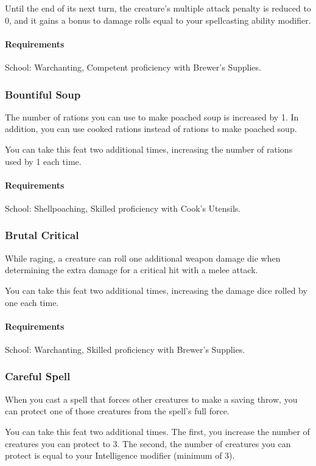     Until the end of its next turn, the creature's multiple attack penalty is reduced to 0, and it gains a bonus to damage rolls equal to your spellcasting ability modifier.
    \paragraph{Requirements} School: Warchanting, Competent proficiency with Brewer's Supplies.
\subsubsection{Bountiful Soup} \label{feat::bountifulsoup}
    The number of rations you can use to make poached soup is increased by 1.
    In addition, you can use cooked rations instead of rations to make poached soup.

    You can take this feat two additional times, increasing the number of rations used by 1 each time.
    \paragraph{Requirements} School: Shellpoaching, Skilled proficiency with Cook's Utensils.
\subsubsection{Brutal Critical} \label{feat::brutalcritical}
    While raging, a creature can roll one additional weapon damage die when determining the extra damage for a critical hit with a melee attack.

    You can take this feat two additional times, increasing the damage dice rolled by one each time.
    \paragraph{Requirements} School: Warchanting, Skilled proficiency with Brewer's Supplies.
\subsubsection{Careful Spell} \label{feat::carefulspell}
    When you cast a spell that forces other creatures to make a saving throw, you can protect one of those creatures from the spell's full force.

    You can take this feat two additional times.
    The first, you increase the number of creatures you can protect to 3.
    The second, the number of creatures you can protect is equal to your Intelligence modifier (minimum of 3).
